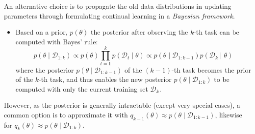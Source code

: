 \documentclass[9pt,dvipsnames]{beamer}
\begin{document}
\begin{frame}
    An alternative choice is to propagate the old data distributions in updating parameters through formulating continual learning in a \textit{Bayesian framework}.
    \begin{itemize}
        \item Based on a prior, \(p(\theta)\) the posterior after observing the \(k\)-th task can be computed with Bayes' rule:
              $$
                  p\left(\theta \mid \mathcal{D}_{1: k}\right) \propto p(\theta) \prod_{t=1}^{k} p\left(\mathcal{D}_{t} \mid \theta\right) \propto p\left(\theta \mid \mathcal{D}_{1: k-1}\right) p\left(\mathcal{D}_{k} \mid \theta\right)
              $$
              where the posterior $p\left(\theta \mid \mathcal{D}_{1: k-1}\right)$ of the $(k-1)$-th task becomes the prior of the $k$-th task, and thus enables the new posterior $p\left(\theta \mid \mathcal{D}_{1: k}\right)$ to be computed with only the current training set $\mathcal{D}_{k}$.
    \end{itemize}
    However, as the posterior is generally intractable (except very special cases), a common option is to approximate it with $q_{k-1}(\theta) \approx p\left(\theta \mid \mathcal{D}_{1: k-1}\right)$, likewise for $q_{k}(\theta) \approx p\left(\theta \mid \mathcal{D}_{1: k}\right)$.
\end{frame}
\end{document}
